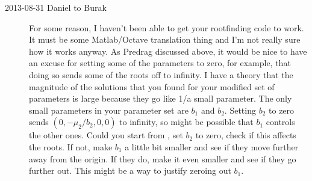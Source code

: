 \begin{description}
{\begin{itemize}
\end{itemize}
    }

\item[2013-08-31 Daniel to Burak] For some reason, I haven't been able to get your rootfinding code to work. It must be some Matlab/Octave translation thing and I'm not really sure how it works anyway. As Predrag discussed above, it would be nice to have an excuse for setting some of the parameters to zero, for example, that doing so sends some of the roots off to infinity. I have a theory that the magnitude of the solutions that you found for your modified set of parameters is large because they go like 1/a small parameter. The only small parameters in your parameter set are $b_1$ and $b_2$. Setting $b_2$ to zero sends $(0,-\mu_2/b_2,0,0)$ to infinity, so might be possible that $b_1$ controls the other ones. Could you start from , set $b_2$ to zero, check if this affects the roots. If not, make $b_1$ a little bit smaller and see if they move further away from the origin. If they do, make it even smaller and see if they go further out. This might be a way to justify zeroing out $b_1$.


\end{description}
